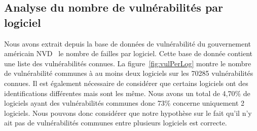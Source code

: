 \subsection{Analyse du nombre de vulnérabilités par logiciel}
Nous avons extrait depuis la base de données de vulnérabilité du gouvernement américain NVD~\cite{vulnDatabase} le nombre de failles par logiciel.
Cette base de donnée contient une liste des vulnérabilités connues.
La figure~\ref{fig:vulPerLog} montre le nombre de vulnérabilité communes à au moins deux logiciels sur les 70285 vulnérabilités connues.
Il est également nécessaire de considérer que certains logiciels ont des identifications différentes mais sont les même.
Nous avons un total de 4,70\% de logiciels ayant des vulnérabilités communes donc 73\% concerne uniquement 2 logiciels.
Nous pouvons donc considérer que notre hypothèse sur le fait qu'il n'y ait pas de vulnérabilités communes entre plusieurs logiciels est correcte.


